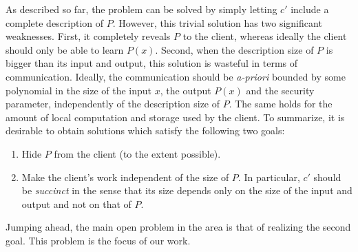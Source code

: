 \documentclass{article}
\begin{document}
As described so far, the problem can be solved by simply letting
$c'$ include a complete description of $P$. However, this trivial
solution has two significant weaknesses. First, it completely
reveals $P$ to the client, whereas ideally the client should only
be able to learn $P(x)$. Second, when the description size of $P$
is bigger than its input and output, this solution is wasteful in
terms of communication. Ideally, the communication should be {\em
a-priori} bounded by some polynomial in the size of the input $x$,
the output $P(x)$ and the security parameter, independently of the
description size of $P$.  The same holds for the amount of local
computation and storage used by the client. To summarize, it is
desirable to obtain solutions which satisfy the following two
goals:
\begin{enumerate}
\item Hide $P$ from the client (to the extent possible).

\item Make the client's work independent of the size of $P$. In
particular, $c'$ should be {\em succinct} in the sense that its
size depends only on the size of the input and output and not
on that of $P$.
\end{enumerate}
Jumping ahead, the main open problem in the area is that of
realizing the second goal. This problem is the focus of our
work.

%
\end{document}
